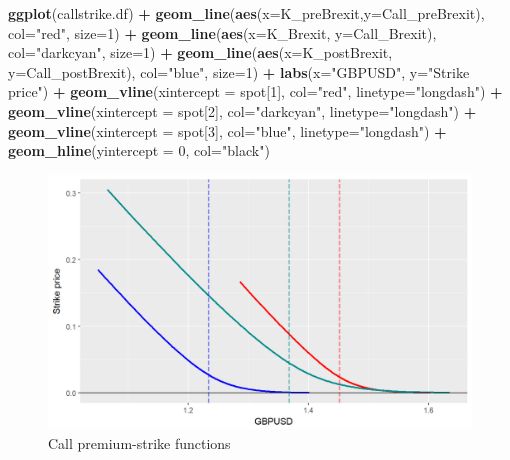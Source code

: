 \documentclass[]{book}
\newenvironment{Shaded}{\begin{snugshade}}{\end{snugshade}}
\newcommand{\KeywordTok}[1]{\textcolor[rgb]{0.13,0.29,0.53}{\textbf{#1}}}
\newcommand{\DataTypeTok}[1]{\textcolor[rgb]{0.13,0.29,0.53}{#1}}
\newcommand{\DecValTok}[1]{\textcolor[rgb]{0.00,0.00,0.81}{#1}}
\newcommand{\StringTok}[1]{\textcolor[rgb]{0.31,0.60,0.02}{#1}}
\newcommand{\OperatorTok}[1]{\textcolor[rgb]{0.81,0.36,0.00}{\textbf{#1}}}
\newcommand{\NormalTok}[1]{#1}
\theoremstyle{definition}
\theoremstyle{definition}
\theoremstyle{definition}
\theoremstyle{remark}
\begin{document}
\begin{Shaded}
\begin{Highlighting}[]
\KeywordTok{ggplot}\NormalTok{(callstrike.df) }\OperatorTok{+}\StringTok{ }\KeywordTok{geom_line}\NormalTok{(}\KeywordTok{aes}\NormalTok{(}\DataTypeTok{x=}\NormalTok{K_preBrexit,}\DataTypeTok{y=}\NormalTok{Call_preBrexit), }\DataTypeTok{col=}\StringTok{"red"}\NormalTok{, }\DataTypeTok{size=}\DecValTok{1}\NormalTok{) }\OperatorTok{+}\StringTok{ }
\StringTok{  }\KeywordTok{geom_line}\NormalTok{(}\KeywordTok{aes}\NormalTok{(}\DataTypeTok{x=}\NormalTok{K_Brexit, }\DataTypeTok{y=}\NormalTok{Call_Brexit), }\DataTypeTok{col=}\StringTok{"darkcyan"}\NormalTok{, }\DataTypeTok{size=}\DecValTok{1}\NormalTok{) }\OperatorTok{+}
\StringTok{  }\KeywordTok{geom_line}\NormalTok{(}\KeywordTok{aes}\NormalTok{(}\DataTypeTok{x=}\NormalTok{K_postBrexit, }\DataTypeTok{y=}\NormalTok{Call_postBrexit), }\DataTypeTok{col=}\StringTok{"blue"}\NormalTok{, }\DataTypeTok{size=}\DecValTok{1}\NormalTok{) }\OperatorTok{+}
\StringTok{  }\KeywordTok{labs}\NormalTok{(}\DataTypeTok{x=}\StringTok{"GBPUSD"}\NormalTok{, }\DataTypeTok{y=}\StringTok{"Strike price"}\NormalTok{) }\OperatorTok{+}\StringTok{ }
\StringTok{  }\KeywordTok{geom_vline}\NormalTok{(}\DataTypeTok{xintercept =}\NormalTok{ spot[}\DecValTok{1}\NormalTok{], }\DataTypeTok{col=}\StringTok{"red"}\NormalTok{, }\DataTypeTok{linetype=}\StringTok{"longdash"}\NormalTok{) }\OperatorTok{+}\StringTok{ }
\StringTok{  }\KeywordTok{geom_vline}\NormalTok{(}\DataTypeTok{xintercept =}\NormalTok{ spot[}\DecValTok{2}\NormalTok{], }\DataTypeTok{col=}\StringTok{"darkcyan"}\NormalTok{, }\DataTypeTok{linetype=}\StringTok{"longdash"}\NormalTok{) }\OperatorTok{+}
\StringTok{  }\KeywordTok{geom_vline}\NormalTok{(}\DataTypeTok{xintercept =}\NormalTok{ spot[}\DecValTok{3}\NormalTok{], }\DataTypeTok{col=}\StringTok{"blue"}\NormalTok{, }\DataTypeTok{linetype=}\StringTok{"longdash"}\NormalTok{) }\OperatorTok{+}
\StringTok{  }\KeywordTok{geom_hline}\NormalTok{(}\DataTypeTok{yintercept =} \DecValTok{0}\NormalTok{, }\DataTypeTok{col=}\StringTok{"black"}\NormalTok{)}
\end{Highlighting}
\end{Shaded}

\begin{figure}
\includegraphics[width=1\linewidth]{images/unnamed-chunk-42-1} \caption{Call premium-strike functions}\label{fig:unnamed-chunk-42}
\end{figure}
\end{document}
